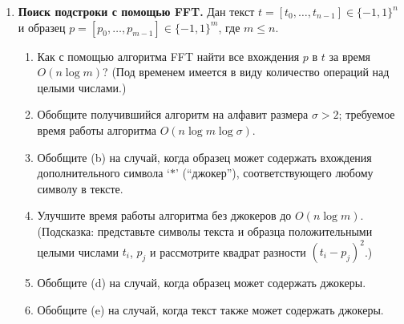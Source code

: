 \documentclass[11pt]{article}
\newenvironment{exercise}{\item}{}
\begin{document}
\begin{enumerate}
\begin{exercise}
\textbf{Поиск подстроки с помощью FFT.}
Дан текст $t = [t_0,\dots,t_{n-1}] \in \{-1,1\}^n$ 
и образец $p = [p_0,\dots,p_{m-1}] \in \{-1,1\}^m$, где $m \leq n$.
\begin{enumerate}
\item Как с помощью алгоритма FFT найти все вхождения $p$ в $t$ за время $O(n \log m)$?
(Под временем имеется в виду количество операций над целыми числами.) 
\item Обобщите получившийся алгоритм на алфавит размера $\sigma > 2$;
требуемое время работы алгоритма $O(n \log m \log\sigma)$.
\item Обобщите (b) на случай, 
когда образец может содержать вхождения дополнительного символа `$*$' (``джокер''), 
соответствующего любому символу в тексте.
\item Улучшите время работы алгоритма без джокеров до $O(n \log m)$.
(Подсказка: представьте символы текста и образца положительными целыми числами $t_i$, $p_j$
и рассмотрите квадрат разности $(t_i-p_j)^2$.)
\item Обобщите (d) на случай, когда образец может содержать джокеры. 
\item Обобщите (e) на случай, когда текст также может содержать джокеры. 

\end{enumerate}
\end{exercise}

\end{enumerate}
\end{document}
